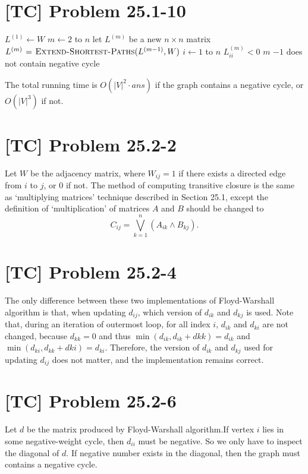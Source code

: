 \documentclass[a4paper,11pt,twocolumn]{article}
\begin{document}
  \section{[TC] Problem 25.1-10}
  \begin{codebox}
    \li $L^{(1)} \gets W$
    \li \For $m \gets 2$ to $n$
    \li \Do  let $L^{(m)}$ be a new $n \times n$ matrix
    \li      $L^{(m)} \mathrel{\hspace{1pt}=\hspace{1pt}} \textnormal{\scshape Extend-Shortest-Paths}(L^{(m-1)}, W)$
    \li      \For $i \gets 1$ to $n$
    \li      \Do  \If $L^{(m)}_{ii} < 0$
    \li           \Do \Return $m$
                  \End
             \End
        \End
    \li \Return $-1$ \Comment does not contain negative cycle
  \end{codebox}
  The total running time is $O(|V|^2 \cdot ans)$ if the graph contains a negative cycle, or $O(|V|^3)$ if not.

  \section{[TC] Problem 25.2-2}
  Let $W$ be the adjacency matrix, where $W_{ij} = 1$ if there exists a directed edge from $i$ to $j$, or $0$ if not. The method of computing transitive closure is the same as `multiplying matrices' technique described in Section 25.1, except the definition of `multiplication' of matrices $A$ and $B$ should be changed to
  $$ C_{ij} = \bigvee_{k = 1}^n (A_{ik} \wedge B_{kj}) .$$

  \section{[TC] Problem 25.2-4}
  The only difference between these two implementations of Floyd-Warshall algorithm is that, when updating $d_{ij}$, which version of $d_{ik}$ and $d_{kj}$ is used. Note that, during an iteration of outermost loop, for all index $i$, $d_{ik}$ and $d_{ki}$ are not changed, because $d_{kk} = 0$ and thus $\min(d_{ik}, d_{ik} + d{kk}) = d_{ik}$ and $\min(d_{ki}, d_{kk} + d{ki}) = d_{ki}$. Therefore, the version of $d_{ik}$ and $d_{kj}$ used for updating $d_{ij}$ does not matter, and the implementation remains correct.

  \section{[TC] Problem 25.2-6}
  Let $d$ be the matrix produced by Floyd-Warshall algorithm.If vertex $i$ lies in some negative-weight cycle, then $d_{ii}$ must be negative. So we only have to inspect the diagonal of $d$. If negative number exists in the diagonal, then the graph must contains a negative cycle.
\end{document}
